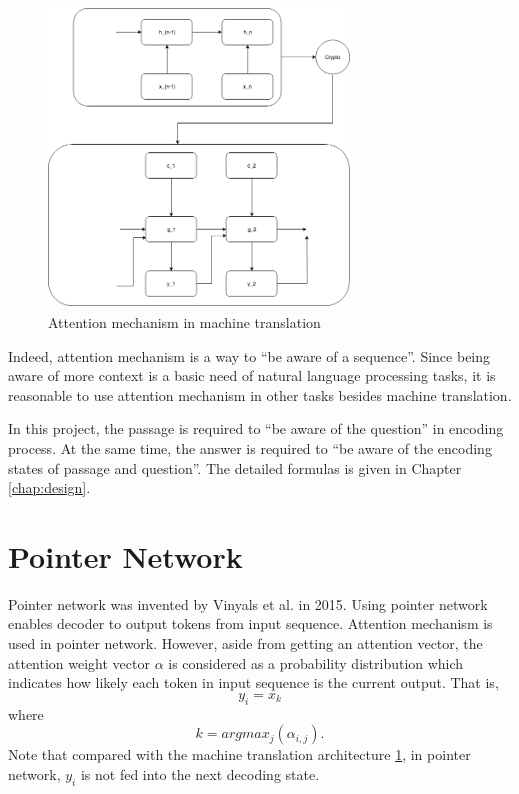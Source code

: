 \documentclass[modernstyle,12pt]{sjsuthesis}
\theoremstyle{definition}
\begin{document}
\begin{figure}[htbp]\centering
  \includegraphics[width=8cm, height=8cm]{figures/attention}
  \caption{Attention mechanism in machine translation}
  \label{f:attention}
\end{figure}



Indeed, attention mechanism is a way to ``be aware of a sequence''. Since being aware of more context is a basic need of natural language processing tasks, it is reasonable to use attention mechanism in other tasks besides machine translation.

In this project, the passage is required to ``be aware of the question'' in encoding process. At the same time, the answer is required to ``be aware of the encoding states of passage and question''. The detailed formulas is given in Chapter \ref{chap:design}.




\section{Pointer Network}\label{sect:pointerNet}

Pointer network\cite{vinyals2015pointer} was invented by Vinyals et al. in 2015. Using pointer network enables decoder to output tokens from input sequence. Attention mechanism is used in pointer network. However, aside from getting an attention vector, the attention weight vector $\alpha$ is considered as a probability distribution which indicates how likely each token in input sequence is the current output. That is,
$$y_i = x_k$$
where
$$k = argmax_j(\alpha _{i,j}).$$
Note that compared with the machine translation architecture \ref{f:attention}, in pointer network, $y_i$ is not fed into the next decoding state.
\end{document}
